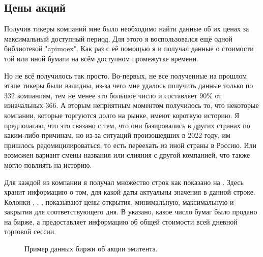 \documentclass[12pt, a4paper]{article}
\begin{document}
\subsection{Цены акций}
Получив тикеры компаний мне было необходимо найти данные об их ценах за максимальный доступный период. Для этого я воспользовался ещё одной библиотекой "apimoex". Как раз с её помощью я и получал данные о стоимости той или иной бумаги на всём доступном промежутке времени.

Но не всё получилось так просто. Во-первых, не все полученные на прошлом этапе тикеры были валидны, из-за чего мне удалось получить данные только по 332 компаниям, тем не менее это большое число и составляет 90\% от изначальных 366. А вторым неприятным моментом получилось то, что некоторые компании, которые торгуются долго на рынке, имеют короткую историю. Я предполагаю, что это связано с тем, что они базировались в других странах по каким-либо причинам, но из-за ситуаций произошедших в 2022 году, им пришлось редомицилироваться, то есть переехать из иной страны в Россию. Или возможен вариант смены названия или слияния с другой компанией, что также могло повлиять на историю.

Для каждой из компании я получал множество строк как показано на .
Здесь  хранит информацию о том, для какой даты актуальны значения в данной строке. Колонки , , ,  показывают цены открытия, минимальную, максимальную и закрытия для соответствующего дня. В  указано, какое число бумаг было продано на бирже, а  предоставляет информацию об общей стоимости всей дневной торговой сессии.
\begin{figure}[H]
\caption{Пример данных биржи об акции эмитента.}
\label{fig:cost_example}
\end{figure}
\end{document}
